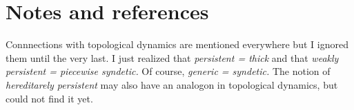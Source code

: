 \documentclass[10pt,openany]{amsproc}
\newcommand{\mylabel}[1]{{\ssf{#1}}\hfill}
\renewenvironment{itemize}
  {\begin{list}{}{%
   \setlength{\parskip}{0mm}
   \setlength{\topsep}{.2\baselineskip}
   \setlength{\rightmargin}{0mm}
   \setlength{\listparindent}{0mm}
   \setlength{\itemindent}{0mm}
   \setlength{\labelwidth}{2ex}
   \setlength{\itemsep}{.1\baselineskip}
   \setlength{\parsep}{0mm}
   \setlength{\partopsep}{0mm}
   \setlength{\labelsep}{1ex}
   \setlength{\leftmargin}{\labelwidth+\labelsep}
   \let\makelabel\mylabel
   }}
   {\vspace*{-.3\baselineskip}\end{list}}
\def\Aut{{\rm Aut\kern.15ex}}
\def\D{\EuScript D}
\def\X{\EuScript X}
\def\Z{\EuScript Z}
\def\U{\EuScript U}
\def\G{\EuScript G}
\def\phi{\varphi}
\def\ssf#1{\textsf{\small #1}}
\newcounter{thm}
\theoremstyle{mio}
\newtheorem{fact}[thm]{Fact}\tcolorboxenvironment{fact}{mythm}
\newtheorem{assumption}[thm]{Assumption}\tcolorboxenvironment{assumption}{mythm}
\def\mr{\color{brown}}
\def\gr{\color{green}}
\def\mrD{{\mr\D}}
\def\mrG{{\mr\G}}
\def\mrX{{\mr\X}}
\def\grG{{\gr\G}}
\def\grZ{{\gr\Z}}
\begin{document}






\section{Notes and references}

Connnections with topological dynamics are mentioned everywhere but I ignored them until the very last.
I just realized that \textit{persistent = thick\/} and that \textit{weakly persistent = piecewise syndetic.}
Of course, \textit{generic = syndetic.}
The notion of \textit{hereditarely persistent\/} may also have an analogon in topological dynamics, but could not find it yet.

\begin{biblist}[]\normalsize

  \end{biblist}
\end{document}
